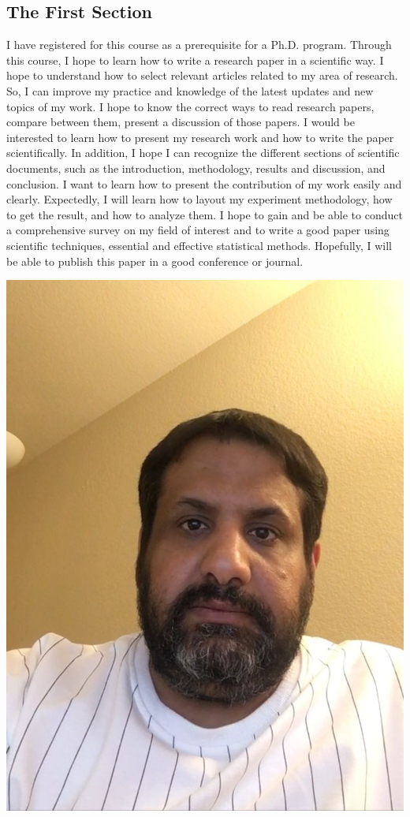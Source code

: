 \subsection{The First Section}

I have registered for this course as a prerequisite for a Ph.D. program. Through this course, I hope to learn how to write a research paper in a scientific way.  I hope to understand how to select relevant articles related to my area of research. So, I can improve my practice and knowledge of the latest updates and new topics of my work. I hope to know the correct ways to read research papers, compare between them, present a discussion of those papers. I would be interested to learn how to present my research work and how to write the paper scientifically. In addition, I hope I can recognize the different sections of scientific documents, such as the introduction, methodology,  results and discussion, and conclusion.  I want to learn how to present the contribution of my work easily and clearly. Expectedly, I will learn how to layout my experiment methodology, how to get the result, and how to analyze them. I hope to gain and be able to conduct a comprehensive survey on my field of interest and to write a good paper using scientific techniques, essential and effective statistical methods. Hopefully, I will be able to publish this paper in a good conference or journal. 

\begin{center}
\includegraphics[scale=0.2]{Khalid.jpeg}
\end{center}



